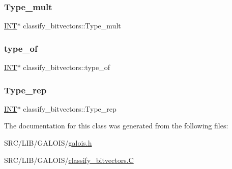 \mbox{\label{classclassify__bitvectors_a40cf6018c244baf60b37a2250987be0a}} 
\subsubsection{\texorpdfstring{Type\+\_\+mult}{Type\_mult}}
{\footnotesize\ttfamily \mbox{\hyperlink{galois_8h_a09fddde158a3a20bd2dcadb609de11dc}{I\+NT}}$\ast$ classify\+\_\+bitvectors\+::\+Type\+\_\+mult}

\mbox{\label{classclassify__bitvectors_ae47562cf63f94a893d230ceae165573b}} 
\subsubsection{\texorpdfstring{type\+\_\+of}{type\_of}}
{\footnotesize\ttfamily \mbox{\hyperlink{galois_8h_a09fddde158a3a20bd2dcadb609de11dc}{I\+NT}}$\ast$ classify\+\_\+bitvectors\+::type\+\_\+of}

\mbox{\label{classclassify__bitvectors_a585a5b065fa1c46f9d993d4e95b9abe6}} 
\subsubsection{\texorpdfstring{Type\+\_\+rep}{Type\_rep}}
{\footnotesize\ttfamily \mbox{\hyperlink{galois_8h_a09fddde158a3a20bd2dcadb609de11dc}{I\+NT}}$\ast$ classify\+\_\+bitvectors\+::\+Type\+\_\+rep}



The documentation for this class was generated from the following files\+:\begin{DoxyCompactItemize}
\item 
S\+R\+C/\+L\+I\+B/\+G\+A\+L\+O\+I\+S/\mbox{\hyperlink{galois_8h}{galois.\+h}}\item 
S\+R\+C/\+L\+I\+B/\+G\+A\+L\+O\+I\+S/\mbox{\hyperlink{classify__bitvectors_8_c}{classify\+\_\+bitvectors.\+C}}\end{DoxyCompactItemize}
